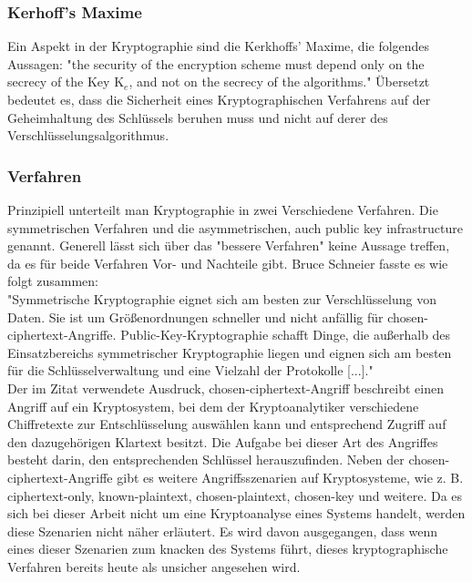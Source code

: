 \documentclass[10pt, a4paper,headsepline]{scrreprt}
\begin{document}
\subsubsection{Kerhoff's Maxime}
Ein Aspekt in der Kryptographie sind die Kerkhoffs' Maxime, die folgendes Aussagen: "the security of the encryption scheme must depend only on the secrecy of the Key K$_{e}$, and not on the secrecy of the algorithms." \citep[S. 23]{book:practical-crypto} Übersetzt bedeutet es, dass die Sicherheit eines Kryptographischen Verfahrens  auf der Geheimhaltung des Schlüssels beruhen muss und nicht auf derer des Verschlüsselungsalgorithmus.


\subsubsection{Verfahren}
Prinzipiell unterteilt man Kryptographie in zwei Verschiedene Verfahren. Die symmetrischen Verfahren und die asymmetrischen, auch public key infrastructure genannt. Generell lässt sich über das "bessere Verfahren" keine Aussage treffen, da es für beide Verfahren Vor- und Nachteile gibt. Bruce Schneier fasste es wie folgt zusammen: \\
"Symmetrische Kryptographie eignet sich am besten zur Verschlüsselung von Daten. Sie ist um Größenordnungen schneller und nicht anfällig für chosen-ciphertext-Angriffe. Public-Key-Kryptographie schafft Dinge, die außerhalb des Einsatzbereichs symmetrischer Kryptographie liegen und eignen sich am besten für die Schlüsselverwaltung und eine Vielzahl der Protokolle [...]." \citep[S. 254f]{book:angewandte-krypto} \\ 
Der im Zitat verwendete Ausdruck, chosen-ciphertext-Angriff beschreibt einen Angriff auf ein Kryptosystem, bei dem der Kryptoanalytiker verschiedene Chiffretexte zur Entschlüsselung auswählen kann und entsprechend Zugriff auf den dazugehörigen Klartext besitzt. Die Aufgabe bei dieser Art des Angriffes besteht darin, den entsprechenden Schlüssel herauszufinden. \citep[S. 7]{book:angewandte-krypto}
Neben der chosen-ciphertext-Angriffe gibt es weitere Angriffsszenarien auf Kryptosysteme, wie z. B. ciphertext-only, known-plaintext, chosen-plaintext, chosen-key und weitere. Da es sich bei dieser Arbeit nicht um eine Kryptoanalyse eines Systems handelt, werden diese Szenarien nicht näher erläutert. Es wird davon ausgegangen, dass wenn eines dieser Szenarien zum knacken des Systems führt, dieses kryptographische Verfahren bereits heute als unsicher angesehen wird.
\end{document}
